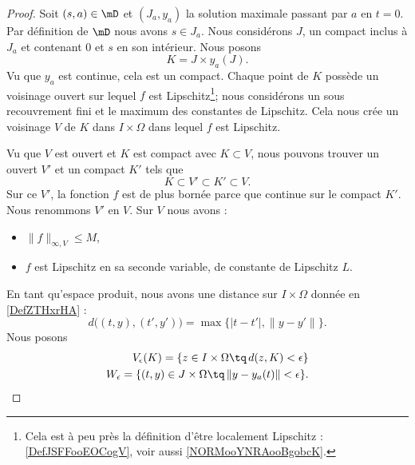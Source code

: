 \begin{proof}
    Soit \( (s,a)\in\mD\) et \( (J_a,y_a)\) la solution maximale passant par \( a\) en \( t=0\). Par définition de \( \mD\) nous avons \( s\in J_a\). Nous considérons \( J\), un compact inclus à \( J_a\) et contenant \( 0\) et \( s\) en son intérieur. Nous posons
    \begin{equation}
        K=J\times y_a(J).
    \end{equation}
    Vu que \( y_a\) est continue, cela est un compact. Chaque point de \( K\) possède un voisinage ouvert sur lequel \( f\) est Lipschitz\footnote{Cela est à peu près la définition d'être localement Lipschitz : \ref{DefJSFFooEOCogV}, voir aussi \ref{NORMooYNRAooBgobcK}.}; nous considérons un sous recouvrement fini et le maximum des constantes de Lipschitz. Cela nous crée un voisinage \( V\) de \( K\) dans \( I\times \Omega\) dans lequel \( f\) est Lipschitz.

    Vu que \( V\) est ouvert et \( K\) est compact avec \( K\subset V\), nous pouvons trouver un ouvert \( V'\) et un compact \( K'\) tels que
    \begin{equation}
        K\subset V'\subset K'\subset V.
    \end{equation}
    Sur ce \( V'\), la fonction \( f\) est de plus bornée parce que continue sur le compact \( K'\). Nous renommons \( V'\) en \( V\). Sur \( V\) nous avons :
    \begin{itemize}
        \item \( \| f \|_{\infty,V}\leq M\),
        \item \( f\) est Lipschitz en sa seconde variable, de constante de Lipschitz \( L\).
    \end{itemize}
    

    En tant qu'espace produit, nous avons une distance sur \( I\times \Omega\) donnée en \ref{DefZTHxrHA} :
    \begin{equation}
        d\big( (t,y),(t',y') \big)=\max\big\{  | t-t' |,\| y-y' \|   \big\}.
    \end{equation}
    Nous posons
    \begin{subequations}
        \begin{align}
            V_{\epsilon}(K)=\{ z\in I\times \Omega \tq\,d(z,K)<\epsilon  \}\\
            W_{\epsilon}=\{ (t,y)\in J\times \Omega\tq\,\| y- y_a(t) \|<\epsilon \}.
        \end{align}
    \end{subequations}
    

\end{proof}
